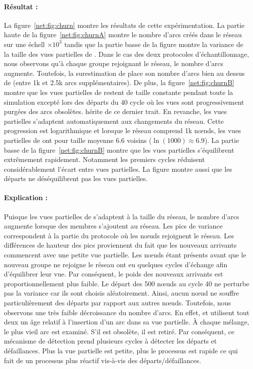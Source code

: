 \paragraph{Résultat :} La figure~\ref{net:fig:churn} montre les résultats de
cette expérimentation. La partie haute de la figure~\ref{net:fig:churnA} montre
le nombre d'arcs créés dans le réseau sur une échell $\times 10^3$ tandis que la
partie basse de la figure montre la variance de la taille des vues partielles de
\SPRAY. Dans le cas des deux protocoles d'échantillonnage, nous observons qu'à
chaque groupe rejoignant le réseau, le nombre d'arcs augmente. Toutefois, la
surestimation de \CYCLON place son nombre d'arcs bien au dessus de \SPRAY (entre
1k et 2.5k arcs supplémentaires). De plus, la figure~\ref{net:fig:churnB} montre
que les vues partielles de \CYCLON restent de taille constante pendant toute la
simulation excepté lors des départs du $40$ cycle où les vues sont
progressivement purgées des arcs obsolètes. \SPRAY hérite de ce dernier
trait. En revanche, les vues partielles s'adaptent automatiquement aux
changements du réseau. Cette progression est logarithmique et lorsque le réseau
comprend 1k nœuds, les vues partielles de \SPRAY ont pour taille moyenne 6.6
voisins ($\ln(1000)\approx6.9$). La partie basse de la
figure~\ref{net:fig:churnB} montre que les vues partielles s'équilibrent
extrêmement rapidement. Notamment les premiers cycles réduisent considérablement
l'écart entre vues partielles. La figure montre aussi que les départs ne
déséquilibrent pas les vues partielles.

\paragraph{Explication :} Puisque les vues partielles de \SPRAY s'adaptent à la
taille du réseau, le nombre d'arcs augmente lorsque des membres s'ajoutent au
réseau. Les pics de variance correspondent à la partie du protocole où les nœuds
rejoignent le réseau. Les différences de hauteur des pics proviennent du fait
que les nouveaux arrivants commencent avec une petite vue partielle. Les nœuds
étant présents avant que le nouveau groupe ne rejoigne le réseau ont eu quelques
cycles d'échange afin d'équilibrer leur vue. Par conséquent, le poids des
nouveaux arrivants est proportionnellement plus faible. Le départ des 500 nœuds
au cycle 40 ne perturbe pas la variance car ils sont choisis
aléatoirement. Ainsi, aucun nœud ne souffre particulièrement des départs par
rapport aux autres nœuds. Toutefois, nous observons une très faible décroissance
du nombre d'arcs. En effet, \CYCLON et \SPRAY utilisent tout deux un âge relatif
à l'insertion d'un arc dans sa vue partielle. À chaque mélange, le plus vieil
arc est examiné. S'il est obsolète, il est retiré. Par conséquent, ce mécanisme
de détection prend plusieurs cycles à détecter les départs et défaillances. Plus
la vue partielle est petite, plus le processus est rapide ce qui fait de \SPRAY
un processus plus réactif vis-à-vis des départs/défaillances.

